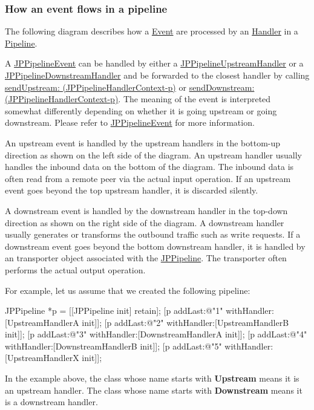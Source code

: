 \subsubsection*{How an event flows in a pipeline}

The following diagram describes how a \hyperlink{a00023}{Event} are processed by an \hyperlink{a00029}{Handler} in a \hyperlink{a00019}{Pipeline}. 

A \hyperlink{a00023}{JPPipelineEvent} can be handled by either a \hyperlink{a00035}{JPPipelineUpstreamHandler} or a \hyperlink{a00021}{JPPipelineDownstreamHandler} and be forwarded to the closest handler by calling \hyperlink{a00030_a9ab02ec0933865652634c54595ff7dd7}{sendUpstream: (JPPipelineHandlerContext-\/p)} or \hyperlink{a00030_a292ed51fe0b2e1ce6b2ed517be5fa5e8}{sendDownstream: (JPPipelineHandlerContext-\/p)}. The meaning of the event is interpreted somewhat differently depending on whether it is going upstream or going downstream. Please refer to \hyperlink{a00023}{JPPipelineEvent} for more information.



An upstream event is handled by the upstream handlers in the bottom-\/up direction as shown on the left side of the diagram. An upstream handler usually handles the inbound data on the bottom of the diagram. The inbound data is often read from a remote peer via the actual input operation. If an upstream event goes beyond the top upstream handler, it is discarded silently. 

A downstream event is handled by the downstream handler in the top-\/down direction as shown on the right side of the diagram. A downstream handler usually generates or transforms the outbound traffic such as write requests. If a downstream event goes beyond the bottom downstream handler, it is handled by an transporter object associated with the \hyperlink{a00019}{JPPipeline}. The transporter often performs the actual output operation. 

For example, let us assume that we created the following pipeline: 
\begin{DoxyCode}
 JPPipeline *p = [[JPPipeline init] retain];
 [p addLast:@"1" withHandler:[UpstreamHandlerA init]];
 [p addLast:@"2" withHandler:[UpstreamHandlerB init]];
 [p addLast:@"3" withHandler:[DownstreamHandlerA init]];
 [p addLast:@"4" withHandler:[DownstreamHandlerB init]];
 [p addLast:@"5" withHandler:[UpstreamHandlerX init]];
\end{DoxyCode}


In the example above, the class whose name starts with {\bfseries Upstream} means it is an upstream handler. The class whose name starts with {\bfseries Downstream} means it is a downstream handler. 

